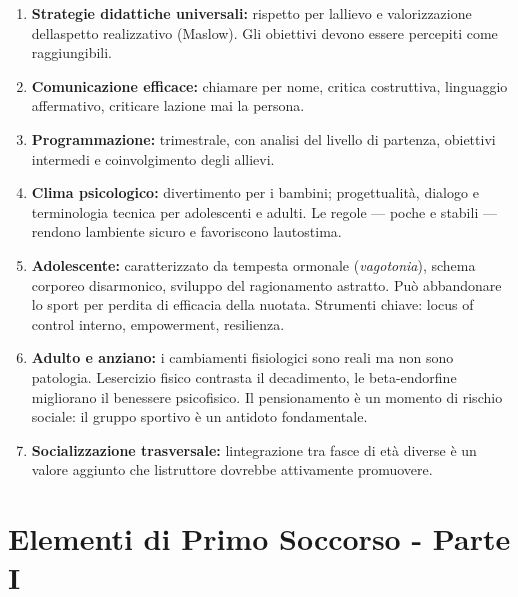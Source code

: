 \documentclass[a4paper,11pt]{article}
\begin{document}
\begin{enumerate}
      \item
            \textbf{Strategie didattiche universali:} rispetto per
            l\textquotesingle allievo e valorizzazione
            dell\textquotesingle aspetto realizzativo (Maslow). Gli obiettivi
            devono essere percepiti come raggiungibili.
      \item
            \textbf{Comunicazione efficace:} chiamare per nome, critica
            costruttiva, linguaggio affermativo, criticare
            l\textquotesingle azione mai la persona.
      \item
            \textbf{Programmazione:} trimestrale, con analisi del livello di
            partenza, obiettivi intermedi e coinvolgimento degli allievi.
      \item
            \textbf{Clima psicologico:} divertimento per i bambini; progettualità,
            dialogo e terminologia tecnica per adolescenti e adulti. Le regole ---
            poche e stabili --- rendono l\textquotesingle ambiente sicuro e
            favoriscono l\textquotesingle autostima.
      \item
            \textbf{Adolescente:} caratterizzato da tempesta ormonale
            (\emph{vagotonia}), schema corporeo disarmonico, sviluppo del
            ragionamento astratto. Può abbandonare lo sport per perdita di
            efficacia della nuotata. Strumenti chiave: locus of control interno,
            empowerment, resilienza.
      \item
            \textbf{Adulto e anziano:} i cambiamenti fisiologici sono reali ma non
            sono patologia. L\textquotesingle esercizio fisico contrasta il
            decadimento, le beta-endorfine migliorano il benessere psicofisico. Il
            pensionamento è un momento di rischio sociale: il gruppo sportivo è un
            antidoto fondamentale.
      \item
            \textbf{Socializzazione trasversale:} l\textquotesingle integrazione
            tra fasce di età diverse è un valore aggiunto che
            l\textquotesingle istruttore dovrebbe attivamente promuovere.
\end{enumerate}

\section{Elementi di Primo Soccorso - Parte
  I}\label{elementi-di-primo-soccorso---parte-i}
\end{document}
